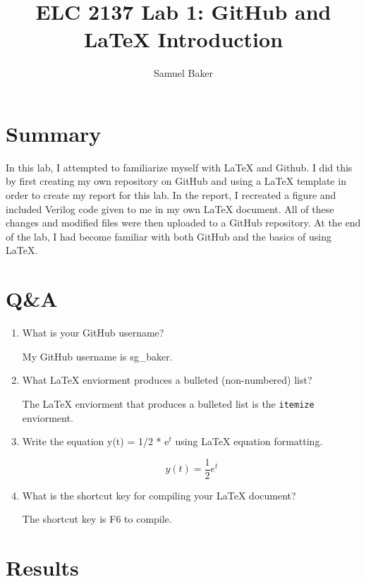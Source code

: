 \documentclass[11pt]{article}
\begin{document}
\title{ELC 2137 Lab 1: GitHub and LaTeX Introduction}
\author{Samuel Baker}

\maketitle


\section*{Summary}

In this lab, I attempted to familiarize myself with LaTeX and Github. I did this by first creating my own repository on GitHub and using a LaTeX template in order to create my report for this lab. In the report, I recreated a figure and included Verilog code given to me in my own LaTeX document. All of these changes and modified files were then uploaded to a GitHub repository. At the end of the lab, I had become familiar with both GitHub and the basics of using LaTeX.


\section*{Q\&A}

\begin{enumerate}
	\item What is your GitHub username?
	
	My GitHub username is sg\_baker.
	
	\item What LaTeX enviorment produces a bulleted (non-numbered) list?
	
	The LaTeX enviorment that produces a bulleted list is the \texttt{itemize} enviorment.
	
	\item Write the equation y(t) = 1/2 * e$^t$ using LaTeX equation formatting.
	
	\begin{equation}
		y(t) = \frac{1}{2}e^t
	\end{equation}
	
	\item What is the shortcut key for compiling your LaTeX document?
	
	The shortcut key is F6 to compile.
\end{enumerate}


\section*{Results}
\end{document}
